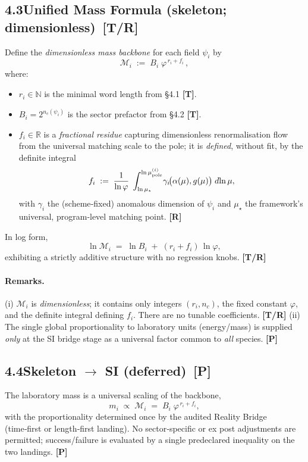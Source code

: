 \documentclass[11pt]{article}
\begin{document}
\subsection*{4.3\quad Unified Mass Formula (skeleton; dimensionless) \,[T/R]}
Define the \emph{dimensionless mass backbone} for each field \(\psi_i\) by
\begin{equation}\label{eq:UMF-skeleton}
  \mathcal M_i\;:=\;B_i\;\varphi^{\,r_i + f_i}\,,
\end{equation}
where:
\begin{itemize}
  \item \(r_i\in\mathbb N\) is the minimal word length from §4.1 \textbf{[T]}.
  \item \(B_i=2^{n_c(\psi_i)}\) is the sector prefactor from §4.2 \textbf{[T]}.
  \item \(f_i\in\mathbb R\) is a \emph{fractional residue} capturing dimensionless renormalisation flow from the universal matching scale to the pole; it is \emph{defined}, without fit, by the definite integral
  \[
     f_i\;:=\;\frac{1}{\ln\varphi}\;
     \int_{\ln\mu_\star}^{\ln\mu_{\rm pole}^{(i)}}\!
        \gamma_i\!\bigl(\alpha(\mu),g(\mu)\bigr)\;d\!\ln\mu,
  \]
  with \(\gamma_i\) the (scheme‑fixed) anomalous dimension of \(\psi_i\) and \(\mu_\star\) the framework’s universal, program‑level matching point. \textbf{[R]}
\end{itemize}
\noindent In log form,
\[
  \ln \mathcal M_i\;=\;\ln B_i\;+\;(r_i+f_i)\,\ln\varphi,
\]
exhibiting a strictly additive structure with no regression knobs. \textbf{[T/R]}

\paragraph{Remarks.} 
(i) \(\mathcal M_i\) is \emph{dimensionless}; it contains only integers \((r_i,n_c)\), the fixed constant \(\varphi\), and the definite integral defining \(f_i\). There are no tunable coefficients. \textbf{[T/R]} 
(ii) The single global proportionality to laboratory units (energy/mass) is supplied \emph{only} at the SI bridge stage as a universal factor common to \emph{all} species. \textbf{[P]}%

\subsection*{4.4\quad Skeleton \(\to\) SI (deferred) \,[P]}
The laboratory mass is a universal scaling of the backbone,
\[
  m_i\;\propto\;\mathcal M_i \;=\; B_i\;\varphi^{\,r_i+f_i},
\]
with the proportionality determined once by the audited Reality Bridge (time‑first or length‑first landing). No sector‑specific or ex post adjustments are permitted; success/failure is evaluated by a single predeclared inequality on the two landings. \textbf{[P]}%
\end{document}
